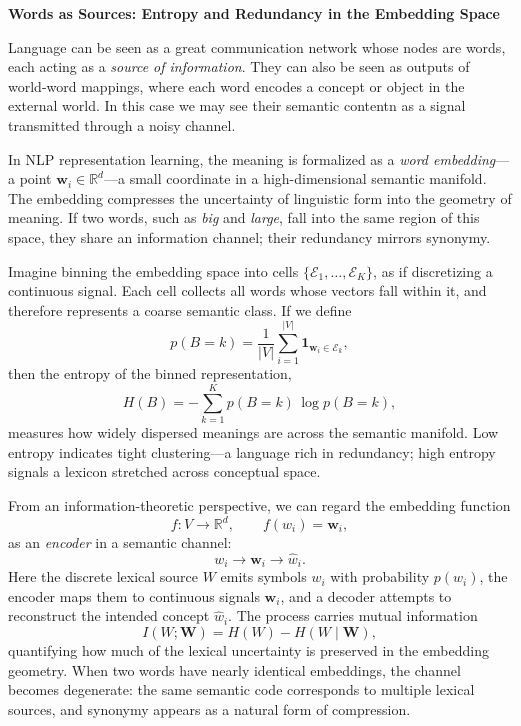 \documentclass[12pt,a4paper]{article}
\begin{document}
\begin{center}
    {\Large\bf Words as Sources: Entropy and Redundancy in the Embedding Space}\\[0.5em]
\end{center}

Language can be seen as a great communication network whose nodes are words, each acting as a {\it source of information}.  
They can also be seen as outputs of world-word mappings, where each word encodes a concept or object in the external world.
In this case we may see their semantic contentn as a signal transmitted through a noisy channel.

In NLP representation learning, the meaning is formalized as a {\it word embedding}---a point 
$\bm{w}_i \in \mathbb{R}^d$---a small coordinate in a high-dimensional semantic manifold.  
The embedding compresses the uncertainty of linguistic form into the geometry of meaning.  
If two words, such as \emph{big} and \emph{large}, fall into the same region of this space, 
they share an information channel; their redundancy mirrors synonymy.

\vspace{1em}

Imagine binning the embedding space into cells $\{ \mathcal{E}_1, \ldots, \mathcal{E}_K \}$, 
as if discretizing a continuous signal.  
Each cell collects all words whose vectors fall within it, and therefore represents a 
coarse semantic class.  
If we define
\begin{equation}
p(B=k) = \frac{1}{|V|}\sum_{i=1}^{|V|} \mathbf{1}_{\bm{w}_i \in \mathcal{E}_k},
\end{equation}
then the entropy of the binned representation,
\begin{equation}
H(B) = - \sum_{k=1}^{K} p(B=k)\,\log p(B=k),
\end{equation}
measures how widely dispersed meanings are across the semantic manifold.  
Low entropy indicates tight clustering---a language rich in redundancy;  
high entropy signals a lexicon stretched across conceptual space.

\vspace{1em}

From an information-theoretic perspective, we can regard the embedding function
\begin{equation}
f : V \rightarrow \mathbb{R}^d, \qquad f(w_i)=\bm{w}_i,
\end{equation}
as an {\it encoder} in a semantic channel:
\[
w_i \longrightarrow \bm{w}_i \longrightarrow \hat{w}_i .
\]
Here the discrete lexical source $W$ emits symbols $w_i$ with probability $p(w_i)$, 
the encoder maps them to continuous signals $\bm{w}_i$, 
and a decoder attempts to reconstruct the intended concept $\hat{w}_i$.  
The process carries mutual information
\begin{equation}
I(W;\bm{W}) = H(W) - H(W\mid \bm{W}),
\end{equation}
quantifying how much of the lexical uncertainty is preserved in the embedding geometry.  
When two words have nearly identical embeddings, 
the channel becomes degenerate: the same semantic code corresponds to multiple lexical sources, 
and synonymy appears as a natural form of compression.
\end{document}
